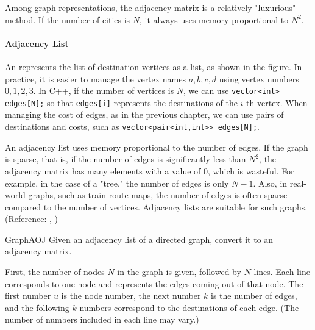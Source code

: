 Among graph representations, the adjacency matrix is a relatively "luxurious" method. If the number of cities is $N$, it always uses memory proportional to $N^2$.

\paragraph{Adjacency List}

An  represents the list of destination vertices as a list, as shown in the figure. In practice, it is easier to manage the vertex names $a, b, c, d$ using vertex numbers $0, 1, 2, 3$. In C++, if the number of vertices is $N$, we can use \texttt{vector<int> edges[N];} so that \texttt{edges[i]} represents the destinations of the $i$-th vertex. When managing the cost of edges, as in the previous chapter, we can use pairs of destinations and costs, such as \texttt{vector<pair<int,int>> edges[N];}.

\begin{center}
\end{center}

An adjacency list uses memory proportional to the number of edges.
If the graph is sparse, that is, if the number of edges is significantly less than $N^2$, the adjacency matrix has many elements with a value of $0$, which is wasteful.
For example, in the case of a "tree," the number of edges is only $N-1$.
Also, in real-world graphs, such as train route maps, the number of edges is often sparse compared to the number of vertices.
Adjacency lists are suitable for such graphs.
(Reference: \pcaojbook[pp.~264--(Chapter 12)], \pccbook[pp.~90, 91])

\begin{psbox}{Graph}{AOJ}
Given an adjacency list of a directed graph, convert it to an adjacency matrix.

First, the number of nodes $N$ in the graph is given, followed by $N$ lines. Each line corresponds to one node and represents the edges coming out of that node. The first number $u$ is the node number, the next number $k$ is the number of edges, and the following $k$ numbers correspond to the destinations of each edge. (The number of numbers included in each line may vary.)

\end{psbox}

